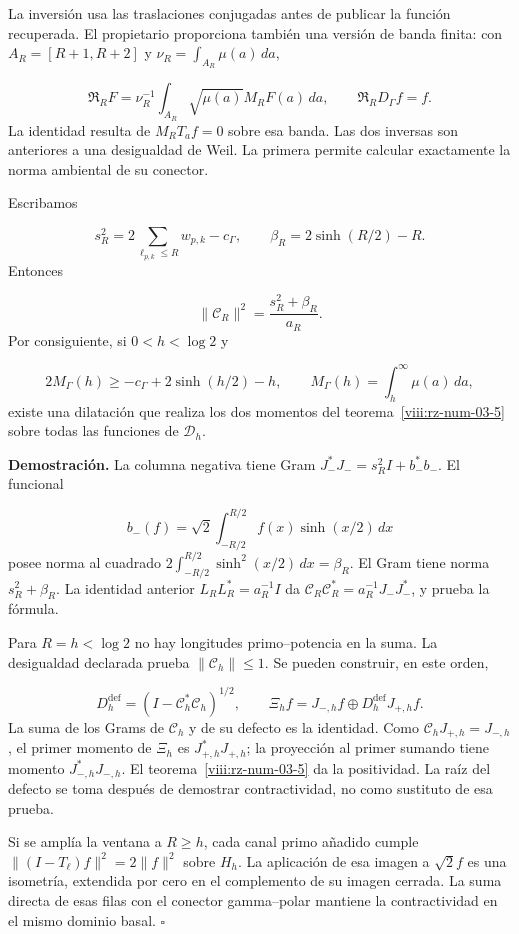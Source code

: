 La inversión usa las traslaciones conjugadas antes de publicar la función recuperada. El propietario proporciona también una versión de banda finita: con \(A_R=[R+1,R+2]\) y \(\nu_R=\int_{A_R}\mu(a)\,da\),

\[
\mathfrak R_RF=\nu_R^{-1}\int_{A_R}
\sqrt{\mu(a)}M_RF(a)\,da,\qquad
\mathfrak R_RD_\Gamma f=f.
\]
La identidad resulta de \(M_RT_af=0\) sobre esa banda. Las dos inversas son anteriores a una desigualdad de Weil. La primera permite calcular exactamente la norma ambiental de su conector.

Escribamos

\[
s_R^2=2\sum_{\ell_{p,k}\leq R}w_{p,k}-c_\Gamma,\qquad
\beta_R=2\sinh(R/2)-R.
\]
Entonces

\[
\|\mathcal C_R\|^2=\frac{s_R^2+\beta_R}{a_R}.
\]
Por consiguiente, si \(0<h<\log2\) y

\[
2M_\Gamma(h)\geq-c_\Gamma+2\sinh(h/2)-h,\qquad
M_\Gamma(h)=\int_h^\infty\mu(a)\,da,
\]
existe una dilatación que realiza los dos momentos del teorema~\ref{viii:rz-num-03-5} sobre todas las funciones de \(\mathcal D_h\).

\textbf{Demostración.} La columna negativa tiene Gram \(J_-^*J_-=s_R^2I+b_-^*b_-\). El funcional

\[
b_-(f)=\sqrt2\int_{-R/2}^{R/2}f(x)\sinh(x/2)\,dx
\]
posee norma al cuadrado \(2\int_{-R/2}^{R/2}\sinh^2(x/2)\,dx=\beta_R\). El Gram tiene norma \(s_R^2+\beta_R\). La identidad anterior \(L_RL_R^*=a_R^{-1}I\) da \(\mathcal C_R\mathcal C_R^*=a_R^{-1}J_-J_-^*\), y prueba la fórmula.

Para \(R=h<\log2\) no hay longitudes primo–potencia en la suma. La desigualdad declarada prueba \(\|\mathcal C_h\|\leq1\). Se pueden construir, en este orden,

\[
D_h^{\mathrm{def}}=(I-\mathcal C_h^*\mathcal C_h)^{1/2},
\qquad
\Xi_hf=J_{-,h}f\oplus D_h^{\mathrm{def}}J_{+,h}f.
\]
La suma de los Grams de \(\mathcal C_h\) y de su defecto es la identidad. Como \(\mathcal C_hJ_{+,h}=J_{-,h}\), el primer momento de \(\Xi_h\) es \(J_{+,h}^*J_{+,h}\); la proyección al primer sumando tiene momento \(J_{-,h}^*J_{-,h}\). El teorema~\ref{viii:rz-num-03-5} da la positividad. La raíz del defecto se toma después de demostrar contractividad, no como sustituto de esa prueba.

Si se amplía la ventana a \(R\geq h\), cada canal primo añadido cumple \(\|(I-T_\ell)f\|^2=2\|f\|^2\) sobre \(H_h\). La aplicación de esa imagen a \(\sqrt2f\) es una isometría, extendida por cero en el complemento de su imagen cerrada. La suma directa de esas filas con el conector gamma–polar mantiene la contractividad en el mismo dominio basal. \hfill\(\square\)

